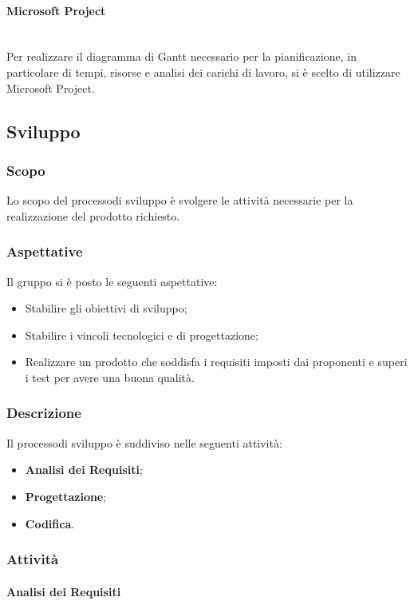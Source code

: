 \paragraph{Microsoft Project}\mbox{}\\ [1mm]
Per realizzare il diagramma di Gantt necessario per la pianificazione, in particolare di tempi, risorse e analisi dei carichi di lavoro, si è scelto di utilizzare Microsoft Project.

\subsection{Sviluppo}
\subsubsection{Scopo}
Lo scopo del processo\glosp di sviluppo è svolgere le attività necessarie per la realizzazione del prodotto richiesto.
\subsubsection{Aspettative}
Il gruppo si è posto le seguenti aspettative:
\begin{itemize}
	\item Stabilire gli obiettivi di sviluppo;
	\item Stabilire i vincoli tecnologici e di progettazione\glo;
	\item Realizzare un prodotto che soddisfa i requisiti imposti dai proponenti e superi i test per avere una buona qualità.
\end{itemize}
\subsubsection{Descrizione}
Il processo\glosp di sviluppo è suddiviso nelle seguenti attività:
\begin{itemize}
	\item \textbf{Analisi dei Requisiti};
	\item \textbf{Progettazione};
	\item \textbf{Codifica}.
\end{itemize}
\subsubsection{Attività}
\paragraph{Analisi dei Requisiti}

